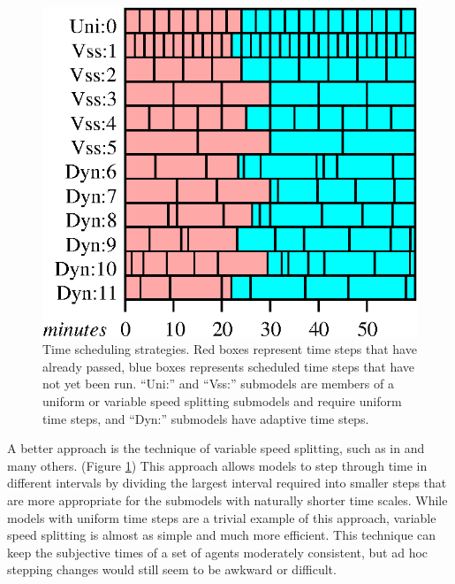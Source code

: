 \begin{figure}
\begin{center}
  \includegraphics{Figure1}
  \caption{Time scheduling strategies.  Red boxes represent time steps that
    have already passed, blue boxes represents scheduled time steps
    that have not yet been run. ``Uni:''  and ``Vss:'' sub\-models are
    members of a uniform or variable speed splitting
    sub\-models and require uniform time steps, and ``Dyn:'' sub\-models
    have adaptive time steps.}
  \label{times}
\end{center}
\end{figure}
A better approach is the technique of variable speed splitting, such
as in \cite{walters2004fisheries} and many others. (Figure \ref{times}) This approach allows models to step through time in
different intervals by dividing the largest interval required into
smaller steps that are more appropriate for the sub\-models with
naturally shorter time scales. While models with uniform time steps are
a trivial example of this approach, variable speed splitting is almost
as simple and much more efficient.  This technique can keep the
subjective times of a set of agents moderately consistent, but ad hoc
stepping changes would still seem to be awkward or difficult.

